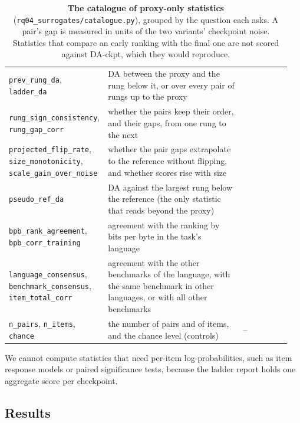 \begin{table}[t]
\begin{tabular}{@{}p{0.2\linewidth}p{0.55\linewidth}p{0.2\linewidth}@{}}
\texttt{prev\_rung\_da}, \texttt{ladder\_da} & DA between the proxy and the rung below it, or over every pair of rungs up to the proxy & \citet{magnusson_datadecide_2025} \\
\texttt{rung\_sign\_consistency}, \texttt{rung\_gap\_corr} & whether the pairs keep their order, and their gaps, from one rung to the next & \citet{liu_regmix_2025} \\
\texttt{projected\_flip\_rate}, \texttt{size\_monotonicity}, \texttt{scale\_gain\_over\_noise} & whether the pair gaps extrapolate to the reference without flipping, and whether scores rise with size & \citet{magnusson_datadecide_2025, bhagia_establishing_2025} \\
\texttt{pseudo\_ref\_da} & DA against the largest rung below the reference (the only statistic that reads beyond the proxy) & \citet{magnusson_datadecide_2025} \\
\texttt{bpb\_rank\_agreement}, \texttt{bpb\_corr\_training} & agreement with the ranking by bits per byte in the task's language & \citet{thrush_improving_2025} \\
\texttt{language\_consensus}, \texttt{benchmark\_consensus}, \texttt{item\_total\_corr} & agreement with the other benchmarks of the language, with the same benchmark in other languages, or with all other benchmarks & \citet{perlitz_benchbench_2024, ruan_observational_2024} \\
\texttt{n\_pairs}, \texttt{n\_items}, \texttt{chance} & the number of pairs and of items, and the chance level (controls) & -- \\
\bottomrule
\end{tabular}
\caption{\textbf{The catalogue of proxy-only statistics} (\texttt{rq04\_surrogates/catalogue.py}), grouped by the question each asks. A pair's gap is measured in units of the two variants' checkpoint noise. Statistics that compare an early ranking with the final one are not scored against DA-ckpt, which they would reproduce.}
\label{tab:sur-catalogue}
\end{table}

We cannot compute statistics that need per-item log-probabilities, such as item response models or paired significance tests, because the ladder report holds one aggregate score per checkpoint.

\subsection{Results}
\label{app:sur-results}

